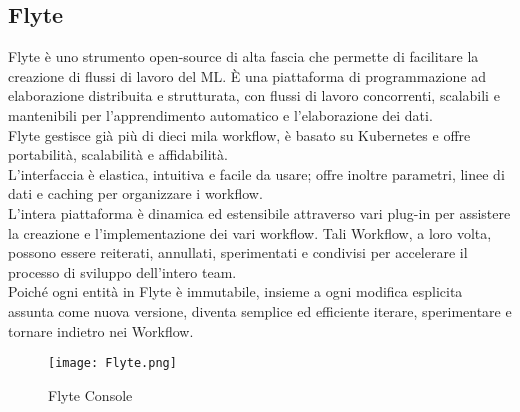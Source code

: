 \documentclass[../tesi.tex]{subfiles}
\begin{document}
\subsection{Flyte}
Flyte è uno strumento open-source di alta fascia che permette di facilitare la creazione di flussi di lavoro del ML. È una piattaforma di programmazione ad elaborazione distribuita e strutturata, con flussi di lavoro concorrenti, scalabili e mantenibili per l’apprendimento automatico e l’elaborazione dei dati.\\
Flyte gestisce già più di dieci mila workflow, è basato su Kubernetes e offre portabilità, scalabilità e affidabilità.\\
L’interfaccia è elastica, intuitiva e facile da usare; offre inoltre parametri, linee di dati e caching per organizzare i workflow.\\
L’intera piattaforma è dinamica ed estensibile attraverso vari plug-in per assistere la creazione e l’implementazione dei vari workflow. Tali Workflow, a loro volta, possono essere reiterati, annullati, sperimentati e condivisi per accelerare il processo di sviluppo dell’intero team.\\
Poiché ogni entità in Flyte è immutabile, insieme a ogni modifica esplicita assunta come nuova versione, diventa semplice ed efficiente iterare, sperimentare e tornare indietro nei Workflow.
\begin{figure}[htbp]
  \centering
  \texttt{[image: Flyte.png]} 
  \caption{Flyte Console}
  \end{figure}

  
\end{document}
